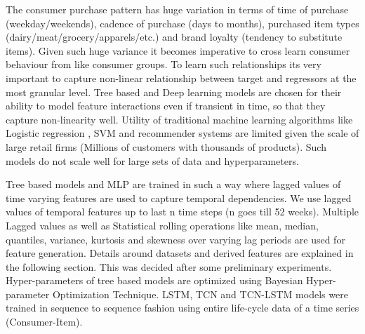 The consumer purchase pattern has huge variation in terms of time of purchase (weekday/weekends), 
cadence of purchase (days to months), purchased item types (dairy/meat/grocery/apparels/etc.)
and brand loyalty (tendency to substitute items). Given such huge variance it becomes imperative 
to cross learn consumer behaviour from like consumer groups. To learn such relationships its very 
important to capture non-linear relationship between target and regressors at the most granular level.
Tree based and Deep learning models are chosen for their ability to model feature interactions even if transient in time, 
so that they capture non-linearity well. Utility of traditional machine learning algorithms like Logistic regression
, SVM and recommender systems are limited given the scale of large retail firms 
(Millions of customers with thousands of products). Such models do not scale well for large sets of data and hyperparameters.

Tree based models and MLP are trained in such a way where lagged values of time varying features are used
to capture temporal dependencies. We use lagged values of temporal features up to last n time steps (n goes till 52 weeks).
Multiple Lagged values as well as Statistical rolling operations like mean, median, quantiles, variance, kurtosis and 
skewness over varying lag periods are used for feature generation. Details around datasets and derived features are explained 
in the following section. This was decided after some preliminary experiments. Hyper-parameters of tree based models are optimized
using Bayesian Hyper-parameter Optimization Technique. LSTM, TCN and TCN-LSTM models were trained in sequence to sequence 
fashion using entire life-cycle data of a time series (Consumer-Item).

